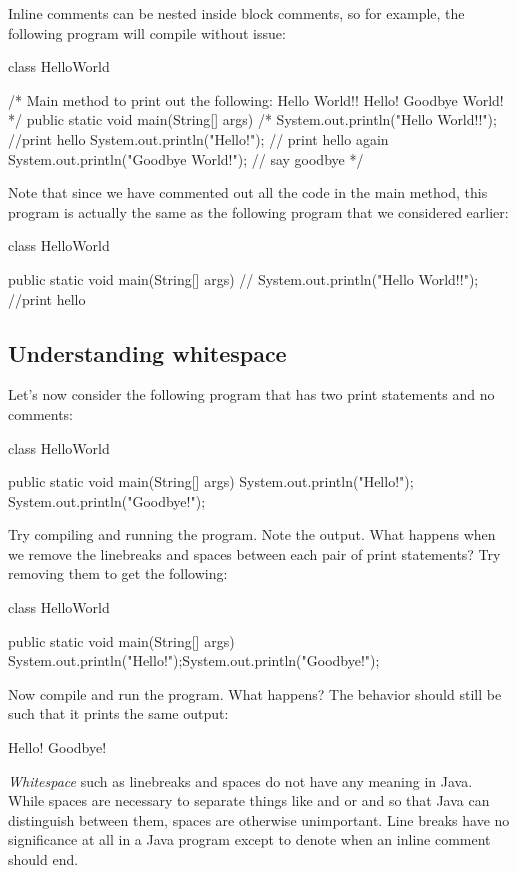 Inline comments can be nested inside block comments, so for example, the following program will compile without issue:
\begin{code}
class HelloWorld {

    /* Main method to print out the following:
         Hello World!!
         Hello!
         Goodbye World!
    */
    public static void main(String[] args) {
        /*
        System.out.println("Hello World!!"); //print hello
        System.out.println("Hello!"); // print hello again
        System.out.println("Goodbye World!"); // say goodbye
        */
    }

}
\end{code}
Note that since we have commented out all the code in the main method, this program is actually the same as the following program that we considered earlier:
\begin{code}
class HelloWorld {

    public static void main(String[] args) {
//        System.out.println("Hello World!!"); //print hello
    }

}
\end{code}

\subsection{Understanding whitespace}

Let's now consider the following program that has two print statements and no comments:
\begin{code}
class HelloWorld {

    public static void main(String[] args) {
        System.out.println("Hello!");
        System.out.println("Goodbye!");
    }

}
\end{code}
Try compiling and running the program. Note the output. What happens when we remove the linebreaks and spaces between each pair of print statements?
Try removing them to get the following:
\begin{code}
class HelloWorld {

    public static void main(String[] args) {
        System.out.println("Hello!");System.out.println("Goodbye!");
    }

}
\end{code}
Now compile and run the program. What happens?
The behavior should still be such that it prints the same output:
\begin{code}
Hello!
Goodbye!
\end{code}
\emph{Whitespace} such as linebreaks and spaces do not have any meaning in Java. While spaces are necessary to separate things like  and  or  and 
so that Java can distinguish between them, spaces are otherwise unimportant. Line breaks have no significance at all in a Java program except to denote when an inline comment should end.

